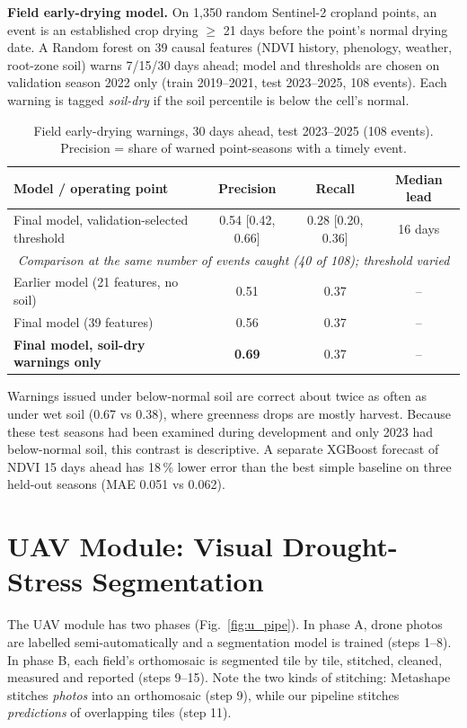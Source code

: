 \documentclass[11pt,a4paper,oneside]{article}
\begin{document}
\textbf{Field early-drying model.} On 1,350 random Sentinel-2 cropland points, an event is an established crop drying $\ge$ 21 days before the point's normal drying date. A Random forest on 39 causal features (NDVI history, phenology, weather, root-zone soil) warns 7/15/30 days ahead; model and thresholds are chosen on validation season 2022 only (train 2019--2021, test 2023--2025, 108 events). Each warning is tagged \emph{soil-dry} if the soil percentile is below the cell's normal.

\begin{table}[H]
\centering
\caption{Field early-drying warnings, 30 days ahead, test 2023--2025 (108 events). Precision = share of warned point-seasons with a timely event.}
\label{tab:r_ed}
\footnotesize
\renewcommand{\arraystretch}{1.25}
\begin{tabular}{|l|c|c|c|}
\hline
\textbf{Model / operating point} & \textbf{Precision} & \textbf{Recall} & \textbf{Median lead} \\ \hline
Final model, validation-selected threshold & 0.54 [0.42, 0.66] & 0.28 [0.20, 0.36] & 16 days \\ \hline
\multicolumn{4}{|c|}{\textit{Comparison at the same number of events caught (40 of 108); threshold varied}} \\ \hline
Earlier model (21 features, no soil) & 0.51 & 0.37 & -- \\ \hline
Final model (39 features) & 0.56 & 0.37 & -- \\ \hline
\textbf{Final model, soil-dry warnings only} & \textbf{0.69} & 0.37 & -- \\ \hline
\end{tabular}
\end{table}
Warnings issued under below-normal soil are correct about twice as often as under wet soil (0.67 vs 0.38), where greenness drops are mostly harvest. Because these test seasons had been examined during development and only 2023 had below-normal soil, this contrast is descriptive. A separate XGBoost forecast of NDVI 15 days ahead has 18\,\% lower error than the best simple baseline on three held-out seasons (MAE 0.051 vs 0.062).

\section{UAV Module: Visual Drought-Stress Segmentation}

The UAV module has two phases (Fig.~\ref{fig:u_pipe}). In phase A, drone photos are labelled semi-automatically and a segmentation model is trained (steps 1--8). In phase B, each field's orthomosaic is segmented tile by tile, stitched, cleaned, measured and reported (steps 9--15). Note the two kinds of stitching: Metashape stitches \emph{photos} into an orthomosaic (step 9), while our pipeline stitches \emph{predictions} of overlapping tiles (step 11).
\end{document}
